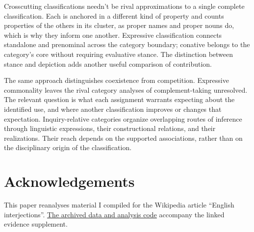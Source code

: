 \documentclass[12pt]{article}
\newif\ifblind
\begin{document}
Crosscutting classifications needn't be rival approximations to a single
complete classification. Each is anchored in a different kind of
property and counts properties of the others in its cluster, as proper
names and proper nouns do, which is why they inform one another. Expressive classification connects standalone and
prenominal  across the category boundary; conative
 belongs to the category's core without requiring evaluative
stance. The distinction between stance and depiction adds another
useful comparison of contribution.

The same approach distinguishes coexistence from competition. Expressive
commonality leaves the rival category analyses of complement-taking
 unresolved. The relevant
question is what each assignment warrants expecting about the identified
use, and where another classification improves or changes that expectation.
Inquiry-relative categories organize overlapping routes of inference through
linguistic expressions, their constructional relations, and their realizations.
Their reach depends on the supported
associations, rather than on the disciplinary origin of the classification.

\ifblind\else
\section*{Acknowledgements}

This paper reanalyses material I compiled for the Wikipedia article
\enquote{English interjections}.
\href{https://github.com/BrettRey/interjections-hpc/tree/master}{The archived
data and analysis code} accompany the linked evidence supplement.
\fi

\clearpage
\begingroup
\setlength{\emergencystretch}{3em}
\printbibliography
\endgroup
\end{document}
